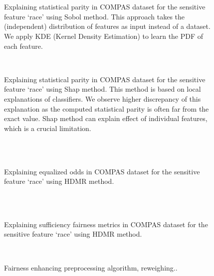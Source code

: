 \begin{figure}
	\centering
	\\
	\\
	\caption{Explaining statistical parity in COMPAS dataset for the sensitive feature `race' using Sobol method. This approach takes the (independent) distribution of features as input instead of a dataset. We apply KDE (Kernel Density Estimation) to learn the PDF of each feature.}
\end{figure}


\begin{figure}
	\centering
	\\
	\caption{Explaining statistical parity in COMPAS dataset for the sensitive feature `race' using Shap method. This method is based on local explanations of classifiers. We observe higher discrepancy of this explanation as the computed statistical parity is often far from the exact value. Shap method can explain effect of individual features, which is a crucial limitation.}
\end{figure}

\begin{figure}
	\centering
	\\
	\\
	\caption{Explaining equalized odds in COMPAS dataset for the sensitive feature `race' using HDMR method.}
\end{figure}


\begin{figure}
	\centering
	\\
	\\
	\caption{Explaining sufficiency fairness metrics in COMPAS dataset for the sensitive feature `race' using HDMR method.}
\end{figure}


\begin{figure}
	\centering
	\\
	\caption{Fairness enhancing preprocessing algorithm, reweighing..}
\end{figure}

